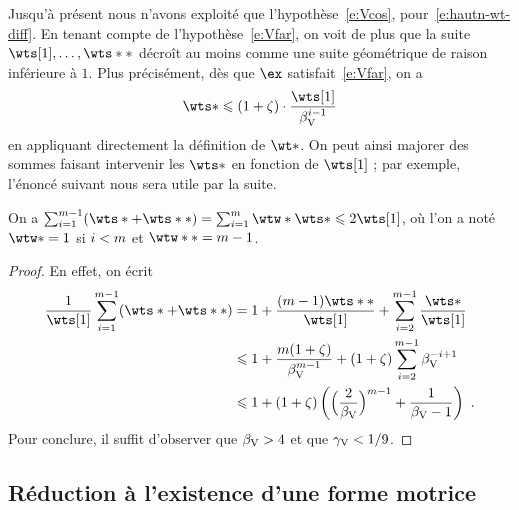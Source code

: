 Jusqu'à présent nous n'avons exploité que l'hypothèse~\eqref{e:Vcos},
pour~\eqref{e:hautn-wt-diff}. En tenant compte de l'hypothèse~\eqref{e:Vfar},
on voit de plus que la suite \( \wts[1], \dots, \wts** \) décroît au moins
comme une suite géométrique de raison inférieure à \( 1 \). Plus précisément,
dès que \( \ex \) satisfait~\eqref{e:Vfar}, on a
\begin{equation} \label{e:wt-geom}
  \wts*
  \le
  (1+\zeta) \cdot \frac{\wts[1]}{\Vfar^{\fct-1}}
\end{equation}
en appliquant directement la définition de \( \wt* \). On peut ainsi majorer
des sommes faisant intervenir les \( \wts* \) en fonction de \( \wts[1] \) ;
par exemple, l'énoncé suivant nous sera utile par la suite.

\begin{lem} \label{l:sum-wts}
  On a \(
    \sum_{\fct=1}^{m-1} (\wts* + \wts**)
    = \sum\fctrange \wtw* \wts*
    \le 2 \wts[1]
  \), où l'on a noté \( \wtw* = 1 \) si \( i < m \) et \( \wtw** =
    m - 1 \).
\end{lem}

\begin{proof}
  En effet, on écrit
  \begin{align}
    \frac1{\wts[1]} \sum_{\fct=1}^{m-1} (\wts* + \wts**)
    & = 1
    + \frac{(m-1) \wts**}{\wts[1]}
    + \sum_{\fct=2}^{m-1} \frac{\wts*}{\wts[1]}
    \\
    & \le 1
    + \frac{m(1+\zeta)}{\Vfar^{m-1}}
    + (1+\zeta) \sum_{\fct=2}^{m-1} \Vfar^{-\fct+1}
    \\
    & \le 1 + (1+\zeta) \left(
      \Bigl( \frac2\Vfar \Bigr)^{m-1}
      + \frac1{\Vfar-1}
    \right)
    \pmm.
  \end{align}
  Pour conclure, il suffit d'observer que \( \beta \sb{\mathrm{V}} > 4 \) et que \( \gamma \sb{\mathrm{V}} <
    1/9 \).
\end{proof}


\subsection{Réduction à l'existence d'une forme motrice}
\label{sec:vojta-prop}

